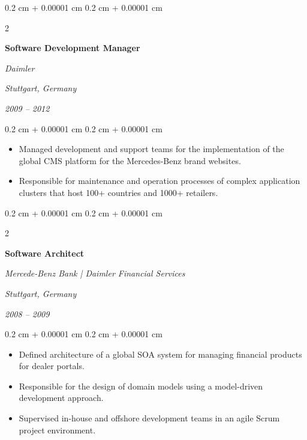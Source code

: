 \documentclass[10pt, a4paper]{article}
\newenvironment{highlights}{
    \begin{itemize}[
        topsep=0.10 cm,
        parsep=0.10 cm,
        partopsep=0pt,
        itemsep=0pt,
        leftmargin=0.4 cm + 10pt
    ]
}{
    \end{itemize}
} %
\newenvironment{onecolentry}{
    \begin{adjustwidth}{
        0.2 cm + 0.00001 cm
    }{
        0.2 cm + 0.00001 cm
    }
}{
    \end{adjustwidth}
} %
\newenvironment{twocolentry}[2][]{
    \onecolentry
    \def\secondColumn{#2}
    \setcolumnwidth{\fill, 8 cm}
    \begin{paracol}{2}
}{
    \switchcolumn \raggedleft \secondColumn
    \end{paracol}
    \endonecolentry
} %
\begin{document}
\vspace{0.20 cm}



%
%
\begin{twocolentry}{
        \textit{Stuttgart, Germany}

        \textit{2009 – 2012}}
    \textbf{Software Development Manager}

    \textit{Daimler}
\end{twocolentry}

\vspace{0.10 cm}
\begin{onecolentry}
    \begin{highlights}
        \item Managed development and support teams for the implementation of the global CMS platform for the Mercedes-Benz brand websites.
        \item Responsible for maintenance and operation processes of complex application clusters that host 100+ countries and 1000+ retailers.
    \end{highlights}
\end{onecolentry}

\vspace{0.20 cm}



%
%
\begin{twocolentry}{
        \textit{Stuttgart, Germany}

        \textit{2008 – 2009}}
    \textbf{Software Architect}

    \textit{Mercede-Benz Bank | Daimler Financial Services}
\end{twocolentry}

\vspace{0.10 cm}
\begin{onecolentry}
    \begin{highlights}
        \item Defined architecture of a global SOA system for managing financial products for dealer portals.
        \item Responsible for the design of domain models using a model-driven development approach.
        \item Supervised in-house and offshore development teams in an agile Scrum project environment.
    \end{highlights}
\end{onecolentry}

\vspace{0.20 cm}
\end{document}
